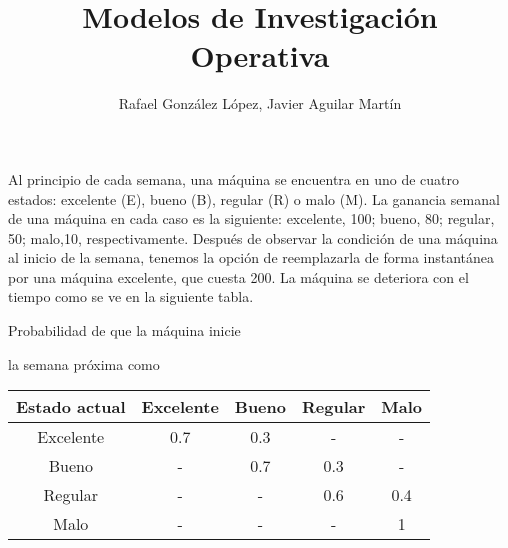 \documentclass[twoside]{article}
\begin{document}
\title{Modelos de Investigación Operativa}
\author{Rafael González López, Javier Aguilar Martín}
\maketitle

\begin{ejercicio}{1}
Al principio de cada semana, una máquina se encuentra en uno de cuatro estados: excelente (E), bueno (B), regular (R) o malo (M). La ganancia semanal de una máquina en cada caso es la siguiente: excelente, 100; bueno, 80; regular, 50; malo,10, respectivamente. Después de observar la condición de una máquina al inicio de la semana, tenemos la opción de reemplazarla de forma instantánea por una máquina excelente, que cuesta 200. La máquina se deteriora con el tiempo como se ve en la siguiente tabla.

\hskip2.7cm Probabilidad de que la máquina inicie

\hskip3.7cm la semana próxima como

\begin{tabular}{ccccc}
\hline
Estado actual & Excelente & Bueno & Regular & Malo\\
\hline
Excelente & 0.7 & 0.3 & - & -\\
Bueno &      -  & 0.7 & 0.3 & -\\
Regular & - & - & 0.6 & 0.4\\
Malo & - & - & - & 1
\end{tabular}


\end{ejercicio}
\end{document}
